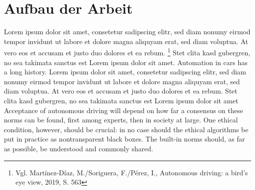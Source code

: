\section{Aufbau der Arbeit}

Lorem ipsum dolor sit amet, consetetur sadipscing elitr, sed diam nonumy eirmod tempor invidunt ut labore et dolore magna aliquyam erat, sed diam voluptua. 
At vero eos et accusam et justo duo dolores et ea rebum. \footnote{Vgl. Martínez-Díaz, M./Soriguera, F./Pérez, I., Autonomous driving: a bird's eye view, 2019, S. 563}
Stet clita kasd gubergren, no sea takimata sanctus est Lorem ipsum dolor sit amet. 
Automation in cars has a long history.  Lorem ipsum dolor sit amet, consetetur sadipscing elitr, sed diam nonumy eirmod tempor invidunt ut labore et dolore magna aliquyam erat, sed diam voluptua. 
At vero eos et accusam et justo duo dolores et ea rebum. 
Stet clita kasd gubergren, no sea takimata sanctus est Lorem ipsum dolor sit amet Acceptance of autonomous driving will depend on how far a consensus on these norms can be found, first among experts, then in society at large. 
One ethical condition, however, should be crucial: in no case should the ethical algorithms be put in practice as nontransparent black boxes. 
The built-in norms should, as far as possible, be understood and commonly shared.
